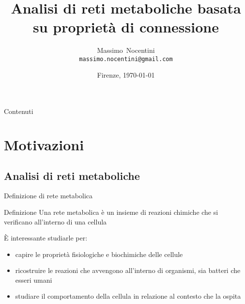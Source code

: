 \documentclass[8pt]{beamer}
\title[Analisi di reti metaboliche] {Analisi di reti metaboliche
  basata su propriet\`a di connessione}
\author[Massimo Nocentini] %
{Massimo~Nocentini\\\texttt{massimo.nocentini@gmail.com}}
\institute[UniversitaStudiFirenze] %
 { Universit\`a degli Studi di Firenze }
\date[CoursePresentation] %
{Firenze, \today}
\begin{document}
\begin{frame}[plain]
  \titlepage
\end{frame}

\begin{frame}{Contenuti}
  \tableofcontents[pausesections]
\end{frame}





\section{Motivazioni}

\subsection{Analisi di reti metaboliche}

\begin{frame}{Definizione di rete metabolica}
  \begin{block}{Definizione}
    Una rete metabolica \`e un insieme di reazioni chimiche che si
    verificano all'interno di una cellula
  \end{block}
  \`E interessante studiarle per:
  \begin{itemize}
  \item capire le propriet\`a fisiologiche e biochimiche delle
    cellule
  \item ricostruire le reazioni che avvengono all'interno di
    organismi, sia batteri che esseri umani
  \item studiare il comportamento della cellula in relazione al
    contesto che la ospita
  \end{itemize}
\end{frame}
\end{document}
